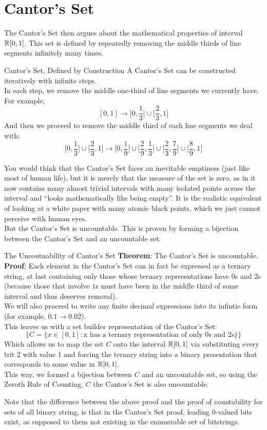 \section{Cantor's Set}
The Cantor's Set then argues about the mathematical properties of interval $\mathbb{R}[0, 1]$. This set is defined by repeatedly removing the middle thirds of line segments infinitely many times.
\begin{ln-define}{Cantor's Set, Defined by Construction}{}
    A Cantor's Set can be constructed iteratively with infinite steps. \\
    In each step, we remove the middle one-third of line segments we currently have. For example,
    \[[0, 1] \rightarrow \bigg[ 0, \frac{1}{3} \bigg] \cup \bigg[ \frac{2}{3}, 1 \bigg]\]
    And then we proceed to remove the middle third of each line segments we deal with:
    \[\bigg[0, \frac{1}{3} \bigg] \cup \bigg[\frac{2}{3}, 1 \bigg] \rightarrow \bigg[0, \frac{1}{9} \bigg] \cup \bigg[\frac{2}{9}, \frac{1}{3} \bigg] \cup \bigg[\frac{2}{3}, \frac{7}{9} \bigg] \cup \bigg[\frac{8}{9}, 1 \bigg]\]
\end{ln-define}
You would think that the Cantor's Set faces an inevitable emptiness (just like most of human life), but it is merely that the measure of the set is zero, as in it now contains many almost trivial intervals with many isolated points across the interval and ``looks mathematically like being empty''. It is the realistic equivalent of looking at a white paper with many atomic black points, which we just cannot perceive with human eyes. \\
But the Cantor's Set is uncountable. This is proven by forming a bijection between the Cantor's Set and an uncountable set:
\begin{ln-theorem}{The Uncoutnability of Cantor's Set}{}
    \textbf{Theorem}: The Cantor's Set is uncountable.
    \tcblower
    \textbf{Proof}: Each element in the Cantor's Set can in fact be expressed as a ternary string, at last containing only those whose ternary representations have $0$s and $2$s (because those that involve $1$s must have been in the middle third of some interval and thus deserves removal). \\
    We will also proceed to write any finite decimal expressions into its infintie form (for example, $0.1 \rightarrow 0.0\overline{2}$). \\
    This leaves us with a set builder representation of the Cantor's Set:
    \[
        \bigg\{C = \{x \in [0, 1]: \text{x has a ternary representation of only 0s and 2s}\} \bigg\}
    \]
    Which allows us to map the set $C$ onto the interval $\mathbb{R}[0, 1]$ via substituting every trit $2$ with value $1$ and forcing the ternary string into a binary presentation that corresponds to some value in $\mathbb{R}[0, 1]$. \\
    This way, we formed a bijection between $C$ and an uncountable set, so using the Zeroth Rule of Counting, $C$ the Cantor's Set is also uncountable.
\end{ln-theorem}
Note that the difference between the above proof and the proof of countability for sets of all binary string, is that in the Cantor's Set proof, leading $0$-valued bits exist, as supposed to them not existing in the enumerable set of bitstrings.

